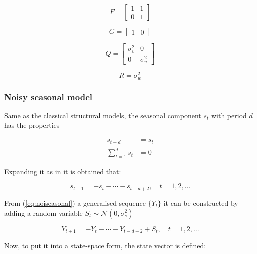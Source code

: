\begin{equation}\label{eq:F_trend}
	F = \begin{bmatrix}
		1 & 1 \\
		0 & 1 
	\end{bmatrix}
\end{equation}

\begin{equation}
	G = \begin{bmatrix}1 & 0\end{bmatrix}
\end{equation} 

\begin{equation}
	Q = \begin{bmatrix}
		\sigma^2_v 	& 0 \\
		0 			& \sigma^2_u 
	\end{bmatrix}
\end{equation}

\begin{equation}
	R = \sigma^2_w
\end{equation}

\subsubsection{Noisy seasonal model}

Same as the classical structural models, the seasonal component $s_t$ with period $d$ has the properties \cite{maravall1985structural}

\begin{align*}
	s_{t+d} &= s_t \\
	\sum_{t=1}^{d}{s_t} &= 0
\end{align*}

Expanding it as in \cite{brockwell2016introduction} it is obtained that:

\begin{equation}\label{eq:noiseasonal}
	s_{t+1} = -s_t - \cdots - s_{t-d+2}, \quad t=1,2,\ldots
\end{equation}

From (\ref{eq:noiseasonal}) a generalised sequence $\{Y_t\}$ it can be constructed by adding a random variable $S_t \sim \mathcal{N}(0, \sigma^2_s)$

\begin{equation}
	Y_{t+1} = -Y_t - \cdots - Y_{t-d+2} + S_t, \quad t=1,2,\ldots
\end{equation} 

Now, to put it into a state-space form, the state vector is defined:

